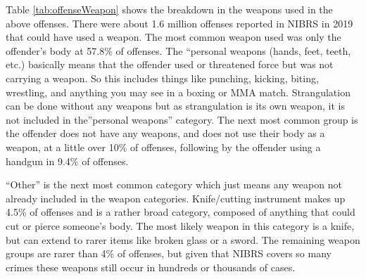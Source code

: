 \documentclass[
]{krantz}
\begin{document}
Table \ref{tab:offenseWeapon} shows the breakdown in the
weapons used in the above offenses. There were about 1.6
million offenses reported in NIBRS in 2019 that could have
used a weapon. The most common weapon used was only the
offender's body at 57.8\% of offenses. The ``personal
weapons (hands, feet, teeth, etc.) basically means that the
offender used or threatened force but was not carrying a
weapon. So this includes things like punching, kicking,
biting, wrestling, and anything you may see in a boxing or
MMA match. Strangulation can be done without any weapons but
as strangulation is its own weapon, it is not included in
the''personal weapons'' category. The next most common group
is the offender does not have any weapons, and does not use
their body as a weapon, at a little over 10\% of offenses,
following by the offender using a handgun in 9.4\% of
offenses.

``Other'' is the next most common category which just means
any weapon not already included in the weapon categories.
Knife/cutting instrument makes up 4.5\% of offenses and is a
rather broad category, composed of anything that could cut
or pierce someone's body. The most likely weapon in this
category is a knife, but can extend to rarer items like
broken glass or a sword. The remaining weapon groups are
rarer than 4\% of offenses, but given that NIBRS covers so
many crimes these weapons still occur in hundreds or
thousands of cases.
\end{document}
